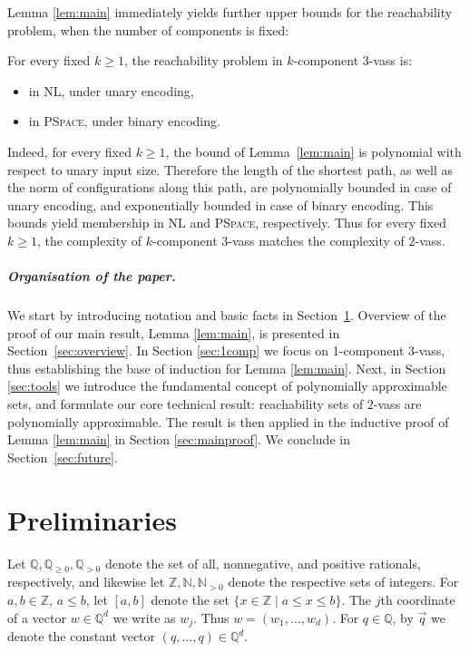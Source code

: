 \documentclass[a4paper, UKenglish, cleveref, autoref, thm-restate]{lipics-v2021}
\newcommand{\sandwich}{polynomially approximable\xspace}
\newcommand{\N}{\mathbb{N}}
\newcommand{\Z}{\mathbb{Z}}
\newcommand{\Q}{\mathbb{Q}}
\newcommand{\Qpos}{\Q_{>0}}
\newcommand{\nl}{\textsc{NL}\xspace}
\newcommand{\pspace}{\textsc{PSpace}\xspace}
\renewcommand{\vec}[1]{\overrightarrow{#1}}
\newcommand{\vass}{{\sc vass}\xspace}
\newcommand{\dvass}{\parvass 2}
\newcommand{\tvass}{\parvass 3}
\newcommand{\parvass}[1]{{$#1$-\vass}\xspace}
\newcommand{\para}[1]{\vspace{-3mm}\subparagraph*{\bf #1.}}
\newcommand{\setfromto}[2]{[#1, #2]}
\newcommand{\Qnonneg}{\Q_{\geq 0}}
\newcommand{\Npos}{\N_{>0}}
\begin{document}
Lemma \ref{lem:main} immediately yields further upper bounds for the reachability problem,
when the number of components is fixed:

\begin{corollary}\label{cor:fixed-components}
For every fixed $k \geq 1$, the reachability problem in $k$-component \tvass is:
\begin{itemize}
  \item in \nl, under unary encoding,
  \item in \pspace, under binary encoding.
\end{itemize}
\end{corollary}

\noindent
Indeed, for every fixed $k\geq 1$, the bound of Lemma~\ref{lem:main} is polynomial with respect to
unary input size.
Therefore the length of the shortest path, as well as the norm of configurations along this path, are 
polynomially bounded in case of unary encoding,
and exponentially bounded in case of binary encoding.
This bounds yield membership in \nl and \pspace, respectively.
Thus for every fixed $k\geq 1$, the complexity of $k$-component \tvass matches the complexity of \dvass.



\para{Organisation of the paper}
We start by introducing notation and basic facts in Section~\ref{sec:def}.
Overview of the proof of our main result, Lemma \ref{lem:main}, is presented in Section~\ref{sec:overview}.
In Section \ref{sec:1comp} we focus on 1-component \tvass, thus establishing the base of induction
for Lemma \ref{lem:main}.
Next, in Section \ref{sec:tools} we introduce the fundamental concept of \sandwich sets,
and formulate our core technical result: reachability sets of \dvass
are \sandwich.
The result is then applied in the inductive proof of Lemma \ref{lem:main} in Section \ref{sec:mainproof}.
We conclude in Section~\ref{sec:future}.
















 

\section{Preliminaries}\label{sec:def}

Let $\Q, \Qnonneg, \Qpos$ denote the set of all, nonnegative, and positive rationals, respectively,
and likewise let $\Z, \N, \Npos$ denote the respective sets of integers.
For $a, b \in \Z$, $a \leq b$, let $\setfromto a b$ denote the set $\{x \in \Z \mid a \leq x \leq b\}$.
The $j$th coordinate of a vector $w\in\Q^d$ we write as $w_j$.
Thus $w = (w_1, \ldots, w_d)$.
For $q\in \Q$,
by $\vec q$ we denote the constant vector $(q, \ldots, q) \in \Q^d$.
\end{document}

